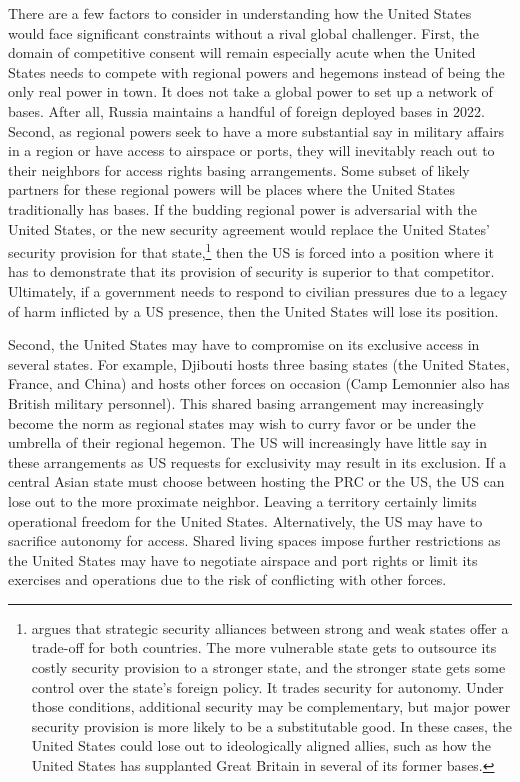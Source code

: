 There are a few factors to consider in understanding how the United States would face significant constraints without a rival global challenger. First, the domain of competitive consent will remain especially acute when the United States needs to compete with regional powers and hegemons instead of being the only real power in town. It does not take a global power to set up a network of bases. After all, Russia maintains a handful of foreign deployed bases in 2022. Second, as regional powers seek to have a more substantial say in military affairs in a region or have access to airspace or ports, they will inevitably reach out to their neighbors for access rights basing arrangements. Some subset of likely partners for these regional powers will be places where the United States traditionally has bases. If the budding regional power is adversarial with the United States, or the new security agreement would replace the United States' security provision for that state,\footnote{ argues that strategic security alliances between strong and weak states offer a trade-off for both countries. The more vulnerable state gets to outsource its costly security provision to a stronger state, and the stronger state gets some control over the state's foreign policy. It trades security for autonomy. Under those conditions, additional security may be complementary, but major power security provision is more likely to be a substitutable good. In these cases, the United States could lose out to ideologically aligned allies, such as how the United States has supplanted Great Britain in several of its former bases.} then the US is forced into a position where it has to demonstrate that its provision of security is superior to that competitor. Ultimately, if a government needs to respond to civilian pressures due to a legacy of harm inflicted by a US presence, then the United States will lose its position.

Second, the United States may have to compromise on its exclusive access in several states. For example, Djibouti hosts three basing states (the United States, France, and China) and hosts other forces on occasion (Camp Lemonnier also has British military personnel). This shared basing arrangement may increasingly become the norm as regional states may wish to curry favor or be under the umbrella of their regional hegemon. The US will increasingly have little say in these arrangements as US requests for exclusivity may result in its exclusion. If a central Asian state must choose between hosting the PRC or the US, the US can lose out to the more proximate neighbor. Leaving a territory certainly limits operational freedom for the United States. Alternatively, the US may have to sacrifice autonomy for access.  Shared living spaces impose further restrictions as the United States may have to negotiate airspace and port rights or limit its exercises and operations due to the risk of conflicting with other forces. 

